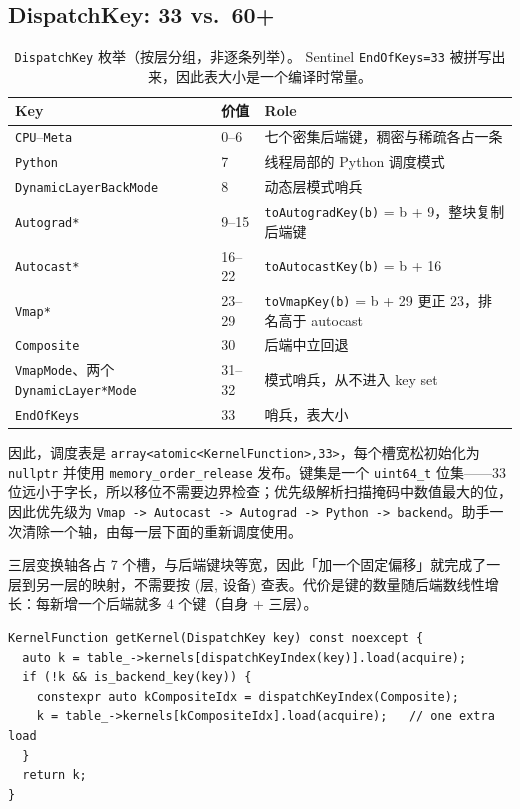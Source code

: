 \subsection{DispatchKey: 33 vs.\ 60+}
\label{subsec:eval-dispatchkey}

\begin{table}[H]
\centering
\caption{\texttt{DispatchKey} 枚举（按层分组，非逐条列举）。 Sentinel \texttt{EndOfKeys=33} 被拼写出来，因此表大小是一个编译时常量。}
\label{tab:dispatchkey}
\small
\begin{tabular}{lll}
\toprule
Key & 价值 & Role \\
\midrule
\texttt{CPU}--\texttt{Meta} & 0--6 & 七个密集后端键，稠密与稀疏各占一条 \\
\texttt{Python} & 7 & 线程局部的 Python 调度模式 \\
\texttt{DynamicLayerBackMode} & 8 & 动态层模式哨兵 \\
\texttt{Autograd*} & 9--15 & \texttt{toAutogradKey(b)} = b + 9，整块复制后端键 \\
\texttt{Autocast*} & 16--22 & \texttt{toAutocastKey(b)} = b + 16 \\
\texttt{Vmap*} & 23--29 & \texttt{toVmapKey(b)} = b + 29 \texorpdfstring{更正}{更正} 23，排名高于 autocast \\
\texttt{Composite} & 30 & 后端中立回退 \\
\texttt{VmapMode}、两个 \texttt{DynamicLayer*Mode} & 31--32 & 模式哨兵，从不进入 key set \\
\texttt{EndOfKeys} & 33 & 哨兵，表大小 \\
\bottomrule
\end{tabular}
\end{table}

因此，调度表是 \texttt{array<atomic<KernelFunction>,33>}，每个槽宽松初始化为 \texttt{nullptr} 并使用 \texttt{memory\_order\_release} 发布。键集是一个 \texttt{uint64\_t} 位集——33 位远小于字长，所以移位不需要边界检查；优先级解析扫描掩码中数值最大的位，因此优先级为 \texttt{Vmap -> Autocast -> Autograd -> Python -> backend}。助手一次清除一个轴，由每一层下面的重新调度使用。

三层变换轴各占 7 个槽，与后端键块等宽，因此「加一个固定偏移」就完成了一层到另一层的映射，不需要按 (层, 设备) 查表。代价是键的数量随后端数线性增长：每新增一个后端就多 4 个键（自身 + 三层）。

\begin{lstlisting}[caption={The \texttt{Composite} fallthrough in the hot path: one extra load, only when a backend slot is empty.}, label=lst:composite]
KernelFunction getKernel(DispatchKey key) const noexcept {
  auto k = table_->kernels[dispatchKeyIndex(key)].load(acquire);
  if (!k && is_backend_key(key)) {
    constexpr auto kCompositeIdx = dispatchKeyIndex(Composite);
    k = table_->kernels[kCompositeIdx].load(acquire);   // one extra load
  }
  return k;
}
\end{lstlisting}

